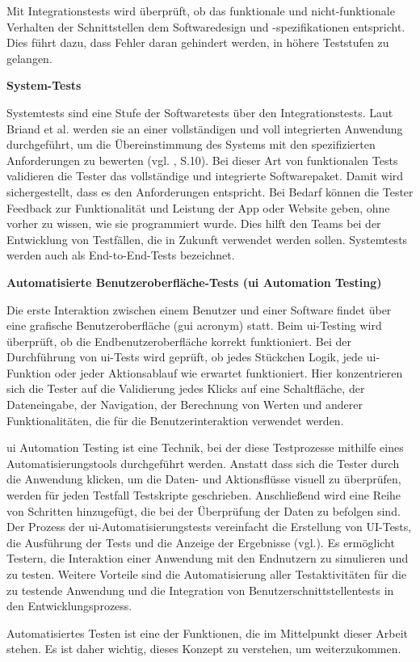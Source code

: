 Mit Integrationstests wird überprüft, ob das funktionale und nicht-funktionale
Verhalten der Schnittstellen dem Softwaredesign und -spezifikationen
entspricht. Dies führt dazu, dass Fehler daran gehindert werden, in höhere
Teststufen zu gelangen.


\textbf{System-Tests}

Systemtests sind eine Stufe der Softwaretests über den Integrationstests.
Laut Briand et al. werden sie an einer vollständigen und voll integrierten
Anwendung durchgeführt, um die Übereinstimmung des Systems mit den
spezifizierten Anforderungen zu bewerten (vgl. \cite{briand2002uml}, S.10).
Bei dieser Art von funktionalen Tests validieren die Tester das vollständige
und integrierte Softwarepaket. Damit wird sichergestellt, dass es den
Anforderungen entspricht. Bei Bedarf können die Tester Feedback zur
Funktionalität und Leistung der App oder Website geben, ohne vorher
zu wissen, wie sie programmiert wurde. Dies hilft den Teams bei der
Entwicklung von Testfällen, die in Zukunft verwendet werden sollen.
Systemtests werden auch als End-to-End-Tests bezeichnet.


\textbf{Automatisierte Benutzeroberfläche-Tests (\acs{ui} Automation Testing) }

Die erste Interaktion zwischen einem Benutzer und einer Software findet
über eine grafische Benutzeroberfläche (\acs{gui} acronym) statt. Beim
\acs{ui}-Testing wird überprüft, ob die Endbenutzeroberfläche korrekt
funktioniert. Bei der Durchführung von \acs{ui}-Tests wird geprüft, ob jedes
Stückchen Logik, jede \acs{ui}-Funktion oder jeder Aktionsablauf wie erwartet
funktioniert. Hier konzentrieren sich die Tester auf die Validierung jedes
Klicks auf eine Schaltfläche, der Dateneingabe, der Navigation, der
Berechnung von Werten und anderer Funktionalitäten, die für die
Benutzerinteraktion verwendet werden.


\acs{ui} Automation Testing ist eine Technik, bei der diese Testprozesse mithilfe
eines Automatisierungstools durchgeführt werden. Anstatt dass sich die
Tester durch die Anwendung klicken, um die Daten- und Aktionsflüsse
visuell zu überprüfen, werden für jeden Testfall Testskripte geschrieben.
Anschließend wird eine Reihe von Schritten hinzugefügt, die bei der
Überprüfung der Daten zu befolgen sind. Der Prozess der
\acs{ui}-Automatisierungstests vereinfacht die Erstellung von UI-Tests, die
Ausführung der Tests und die Anzeige der Ergebnisse (vgl.\cite{Perfecto2020}).
Es ermöglicht Testern, die Interaktion einer Anwendung mit den Endnutzern zu
simulieren und zu testen. Weitere Vorteile sind die Automatisierung aller
Testaktivitäten für die zu testende Anwendung und die Integration von
Benutzerschnittstellentests in den Entwicklungsprozess.


Automatisiertes Testen ist eine der Funktionen, die im Mittelpunkt dieser
Arbeit stehen. Es ist daher wichtig, dieses Konzept zu verstehen, um
weiterzukommen.


